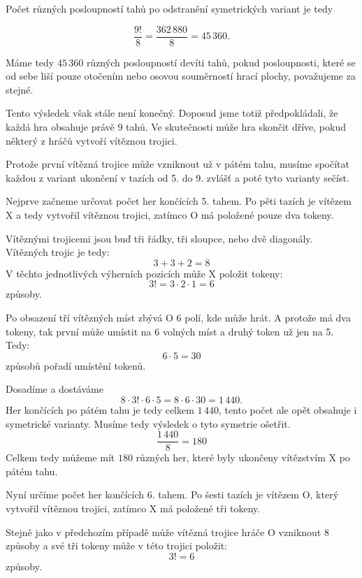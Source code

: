 \documentclass[12pt,a4paper]{article}
\begin{document}
Počet různých posloupností tahů po odstranění symetrických variant je tedy

\begin{equation}
    \frac{9!}{8} = \frac{362\,880}{8} = 45\,360.
\end{equation}

Máme tedy $45\,360$ různých posloupností devíti tahů, pokud posloupnosti,
které se od sebe liší pouze otočením nebo osovou souměrností hrací plochy,
považujeme za stejné.

Tento výsledek však stále není konečný.
Doposud jsme totiž předpokládali, že každá hra obsahuje právě $9$ tahů.
Ve skutečnosti může hra skončit dříve, pokud některý z hráčů vytvoří
vítěznou trojici.

Protože první vítězná trojice může vzniknout už v pátém tahu, 
musíme spočítat každou z variant ukončení v tazích od 5. do 9. zvlášť 
a poté tyto varianty sečíst.

Nejprve začneme určovat počet her končících 5. tahem.
Po pěti tazích je vítězem $\mathrm{X}$ a tedy vytvořil vítěznou trojici, 
zatímco $\mathrm{O}$ má položené pouze dva tokeny.

Vítěznými trojicemi jsou buď tři řádky, tři sloupce, nebo dvě diagonály. 
Vítězných trojic je tedy:
\[
    3+3+2 = 8
\]
V těchto jednotlivých výherních pozicích může $\mathrm{X}$ položit tokeny:
\[
    3! = 3\cdot2\cdot1 = 6
\]
způsoby.

Po obsazení tří vítězných míst zbývá $\mathrm{O}$ 6 polí, kde může hrát. 
A protože má dva tokeny, tak první může umístit na 6 volných míst 
a druhý token už jen na 5. Tedy:
\[
    6\cdot5 = 30
\]
způsobů pořadí umístění tokenů.

Dosadíme a dostáváme
\[
    8\cdot3!\cdot6\cdot5 = 8\cdot6\cdot30 = 1\,440.
\]
Her končících po pátém tahu je tedy celkem $1\,440$, 
tento počet ale opět obsahuje i symetrické varianty. 
Musíme tedy výsledek o tyto symetrie ošetřit.
\begin{equation}
    \frac{1\,440}{8} = 180
\end{equation}
Celkem tedy můžeme mít $180$ různých her, 
které byly ukončeny vítězstvím $\mathrm{X}$ po pátém tahu.

Nyní určíme počet her končících 6. tahem.
Po šesti tazích je vítězem $\mathrm{O}$, který vytvořil vítěznou trojici, 
zatímco $\mathrm{X}$ má položené tři tokeny.

Stejně jako v předchozím případě může vítězná trojice hráče $\mathrm{O}$ vzniknout 8 způsoby 
a své tři tokeny může v této trojici položit:
\[
    3! = 6
\]
způsoby.
\end{document}

